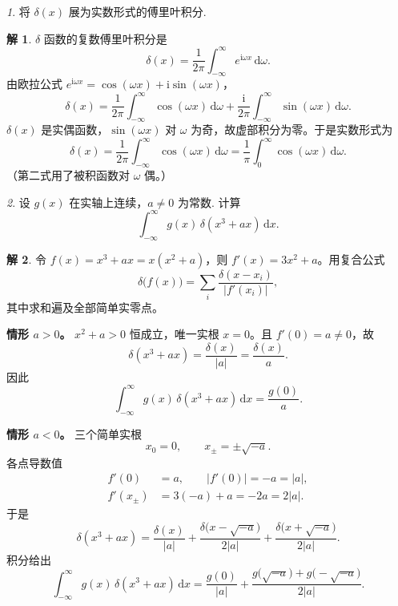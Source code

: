 \documentclass[11pt]{article}
\theoremstyle{remark}
\newtheorem{problem}{}
\theoremstyle{definition}
\newtheorem{solution}{解}
\begin{document}
\renewcommand{\labelenumi}{(\arabic{enumi})}
\renewcommand{\labelenumii}{(\arabic{enumi}.\arabic{enumii})}

\begin{problem}
  将 $\delta(x)$ 展为实数形式的傅里叶积分.
\end{problem}

\begin{solution}
$\delta$ 函数的复数傅里叶积分是
\[
\delta(x)
=\frac{1}{2\pi}\int_{-\infty}^{\infty} e^{\mathrm{i}\omega x}\,\mathrm{d}\omega.
\]
由欧拉公式 $e^{\mathrm{i}\omega x}=\cos(\omega x)+\mathrm{i}\sin(\omega x)$，
\begin{equation*}
\delta(x)
=\frac{1}{2\pi}\int_{-\infty}^{\infty}\cos(\omega x)\,\mathrm{d}\omega
+\frac{\mathrm{i}}{2\pi}\int_{-\infty}^{\infty}\sin(\omega x)\,\mathrm{d}\omega.
\end{equation*}
$\delta(x)$ 是实偶函数，$\sin(\omega x)$ 对 $\omega$ 为奇，故虚部积分为零。于是实数形式为
\[
\delta(x)
=\frac{1}{2\pi}\int_{-\infty}^{\infty}\cos(\omega x)\,\mathrm{d}\omega
=\frac{1}{\pi}\int_0^{\infty}\cos(\omega x)\,\mathrm{d}\omega.
\]
（第二式用了被积函数对 $\omega$ 偶。）
\end{solution}

\begin{problem}
  设 $g(x)$ 在实轴上连续，$a\neq 0$ 为常数. 计算
  \[
  \int_{-\infty}^{\infty} g(x)\,\delta\!\left(x^3+ax\right)\,\mathrm{d}x.
  \]
\end{problem}

\begin{solution}
令 $f(x)=x^3+ax=x(x^2+a)$，则 $f'(x)=3x^2+a$。用复合公式
\[
\delta\bigl(f(x)\bigr)
=\sum_{i}\frac{\delta(x-x_i)}{|f'(x_i)|},
\]
其中求和遍及全部简单实零点。

\medskip
\noindent\textbf{情形 $a>0$。}
$x^2+a>0$ 恒成立，唯一实根 $x=0$。且 $f'(0)=a\neq 0$，故
\[
\delta(x^3+ax)=\frac{\delta(x)}{|a|}=\frac{\delta(x)}{a}.
\]
因此
\[
\int_{-\infty}^{\infty} g(x)\,\delta(x^3+ax)\,\mathrm{d}x
=\frac{g(0)}{a}.
\]

\medskip
\noindent\textbf{情形 $a<0$。}
三个简单实根
\[
x_0=0,\qquad
x_{\pm}=\pm\sqrt{-a}.
\]
各点导数值
\begin{align*}
f'(0)&=a,
\qquad |f'(0)|=-a=|a|,\\
f'(x_{\pm})
&=3(-a)+a=-2a=2|a|.
\end{align*}
于是
\[
\delta(x^3+ax)
=\frac{\delta(x)}{|a|}
+\frac{\delta\bigl(x-\sqrt{-a}\bigr)}{2|a|}
+\frac{\delta\bigl(x+\sqrt{-a}\bigr)}{2|a|}.
\]
积分给出
\[
\int_{-\infty}^{\infty} g(x)\,\delta(x^3+ax)\,\mathrm{d}x
=\frac{g(0)}{|a|}
+\frac{g\bigl(\sqrt{-a}\bigr)+g\bigl(-\sqrt{-a}\bigr)}{2|a|}.
\]
\end{solution}
\end{document}
